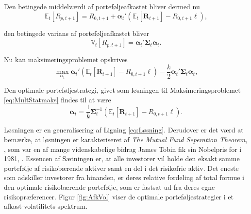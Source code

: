 \documentclass[
  a4paper,
  oneside]{memoir}
\begin{document}
Den betingede middelværdi af porteføljeafkastet bliver dermed nu
\begin{equation*}
\mathbb{E}_t\left[R_{p,t+1}\right]=R_{0,t+1}+\bm{\alpha}_t'(\mathbb{E}_t\left[\bm{R}_{t+1}\right]- R_{0,t+1}\bm{\ell}),
\end{equation*}

den betingede varians af porteføljeafkastet bliver
\begin{equation*}
\mathbb{V}_t\left[R_{p,t+1}\right]=\bm{\alpha}_t'\bm{\Sigma}_t\bm{\alpha}_t.
\end{equation*}

Nu kan maksimeringsproblemet opskrives
\begin{equation}
\max_{\alpha_t} \bm{\alpha}_t'(\mathbb{E}_t\left[\bm{R}_{t+1}\right]- R_{0,t+1}\bm{\ell}) - \frac{k}{2}\bm{\alpha}_t'\bm{\Sigma}_t\bm{\alpha}_t, \label{eq:MultStatmaks}
\end{equation}

Den optimale porteføljestrategi, givet som løsningen til Maksimeringsproblemet \eqref{eq:MultStatmaks} findes til at være
\begin{equation}
\bm{\alpha}_t=\frac{1}{k}\bm{\Sigma}_t^{-1}(\mathbb{E}_t\left[\bm{R}_{t+1}\right]-R_{0,t+1}\bm{\ell}).\label{eq:Multalpha}
\end{equation}

Løsningen er en generalisering af Ligning \eqref{eq:Løsning}. Derudover er det værd at bemærke, at løsningen er karakteriseret af \textit{The Mutual Fund Seperation Theorem}, \citep{Tobin1958}, som var en af mange videnskabelige bidrag James Tobin fik sin Nobelpris for i 1981, \citep{Nobel2020}. Essencen af Sætningen er, at alle investorer vil holde den eksakt samme portefølje af risikobærende aktiver samt en del i det risikofrie aktiv. Det eneste som adskiller investorer fra hinanden, er deres relative fordeling af total formue i den optimale risikobærende portefølje, som er fastsat ud fra deres egne risikopræferencer. Figur \ref{fig:AfkVol} viser de optimale porteføljestrategier i et afkast-volatilitets spektrum.
\end{document}
